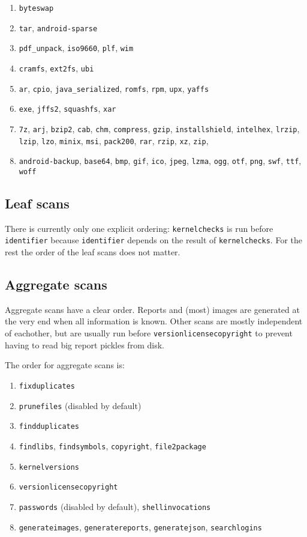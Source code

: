 \documentclass[10pt,a4paper]{article}
\begin{document}
\begin{enumerate}
\item \texttt{byteswap}
\item \texttt{tar}, \texttt{android-sparse}
\item \texttt{pdf\_unpack}, \texttt{iso9660}, \texttt{plf}, \texttt{wim}
\item \texttt{cramfs}, \texttt{ext2fs}, \texttt{ubi}
\item \texttt{ar}, \texttt{cpio}, \texttt{java\_serialized}, \texttt{romfs},
\texttt{rpm}, \texttt{upx}, \texttt{yaffs}
\item \texttt{exe}, \texttt{jffs2}, \texttt{squashfs}, \texttt{xar}
\item \texttt{7z}, \texttt{arj}, \texttt{bzip2}, \texttt{cab}, \texttt{chm},
\texttt{compress}, \texttt{gzip}, \texttt{installshield}, \texttt{intelhex},
\texttt{lrzip}, \texttt{lzip}, \texttt{lzo}, \texttt{minix}, \texttt{msi},
\texttt{pack200}, \texttt{rar}, \texttt{rzip}, \texttt{xz}, \texttt{zip},
\item \texttt{android-backup}, \texttt{base64}, \texttt{bmp}, \texttt{gif},
\texttt{ico}, \texttt{jpeg}, \texttt{lzma}, \texttt{ogg}, \texttt{otf},
\texttt{png}, \texttt{swf}, \texttt{ttf}, \texttt{woff}
\end{enumerate}

\subsection{Leaf scans}

There is currently only one explicit ordering: \texttt{kernelchecks} is run
before \texttt{identifier} because \texttt{identifier} depends on the result
of \texttt{kernelchecks}. For the rest the order of the leaf scans does not
matter.

\subsection{Aggregate scans}

Aggregate scans have a clear order. Reports and (most) images are generated at
the very end when all information is known. Other scans are mostly independent
of eachother, but are usually run before \texttt{versionlicensecopyright} to
prevent having to read big report pickles from disk.

The order for aggregate scans is:

\begin{enumerate}
\item \texttt{fixduplicates}
\item \texttt{prunefiles} (disabled by default)
\item \texttt{findduplicates}
\item \texttt{findlibs}, \texttt{findsymbols}, \texttt{copyright}, \texttt{file2package}
\item \texttt{kernelversions}
\item \texttt{versionlicensecopyright}
\item \texttt{passwords} (disabled by default), \texttt{shellinvocations}
\item \texttt{generateimages}, \texttt{generatereports}, \texttt{generatejson}, \texttt{searchlogins}
\end{enumerate}
\end{document}
